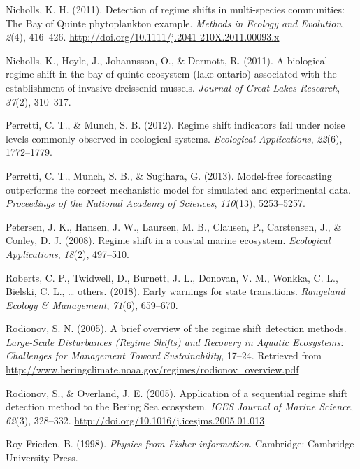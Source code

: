 \documentclass[12pt,twoside,openany]{reedthesis}
\begin{document}
\hypertarget{ref-nicholls_detection_2011}{}
Nicholls, K. H. (2011). Detection of regime shifts in multi-species
communities: The Bay of Quinte phytoplankton example. \emph{Methods in
Ecology and Evolution}, \emph{2}(4), 416--426.
\url{http://doi.org/10.1111/j.2041-210X.2011.00093.x}

\hypertarget{ref-nicholls2011biological}{}
Nicholls, K., Hoyle, J., Johannsson, O., \& Dermott, R. (2011). A
biological regime shift in the bay of quinte ecosystem (lake ontario)
associated with the establishment of invasive dreissenid mussels.
\emph{Journal of Great Lakes Research}, \emph{37}(2), 310--317.

\hypertarget{ref-perretti2012regime}{}
Perretti, C. T., \& Munch, S. B. (2012). Regime shift indicators fail
under noise levels commonly observed in ecological systems.
\emph{Ecological Applications}, \emph{22}(6), 1772--1779.

\hypertarget{ref-perretti_model-free_2013}{}
Perretti, C. T., Munch, S. B., \& Sugihara, G. (2013). Model-free
forecasting outperforms the correct mechanistic model for simulated and
experimental data. \emph{Proceedings of the National Academy of
Sciences}, \emph{110}(13), 5253--5257.

\hypertarget{ref-petersen2008regime}{}
Petersen, J. K., Hansen, J. W., Laursen, M. B., Clausen, P., Carstensen,
J., \& Conley, D. J. (2008). Regime shift in a coastal marine ecosystem.
\emph{Ecological Applications}, \emph{18}(2), 497--510.

\hypertarget{ref-roberts2018early}{}
Roberts, C. P., Twidwell, D., Burnett, J. L., Donovan, V. M., Wonkka, C.
L., Bielski, C. L., \ldots{} others. (2018). Early warnings for state
transitions. \emph{Rangeland Ecology \& Management}, \emph{71}(6),
659--670.

\hypertarget{ref-rodionov_brief_2005}{}
Rodionov, S. N. (2005). A brief overview of the regime shift detection
methods. \emph{Large-Scale Disturbances (Regime Shifts) and Recovery in
Aquatic Ecosystems: Challenges for Management Toward Sustainability},
17--24. Retrieved from
\url{http://www.beringclimate.noaa.gov/regimes/rodionov_overview.pdf}

\hypertarget{ref-rodionov_application_2005}{}
Rodionov, S., \& Overland, J. E. (2005). Application of a sequential
regime shift detection method to the Bering Sea ecosystem. \emph{ICES
Journal of Marine Science}, \emph{62}(3), 328--332.
\url{http://doi.org/10.1016/j.icesjms.2005.01.013}

\hypertarget{ref-roy_frieden_physics_1998}{}
Roy Frieden, B. (1998). \emph{Physics from Fisher information}.
Cambridge: Cambridge University Press.
\end{document}
